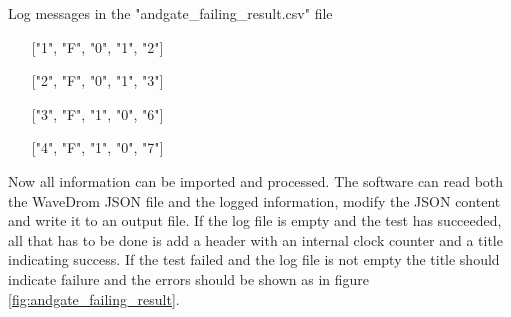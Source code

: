 \begin{customenv}
	\caption{Log messages in the "andgate\_failing\_result.csv" file}
	\begin{itemize}
		\centering
		\item [] ["1", "F", "0", "1", "2"]
		\item [] ["2", "F", "0", "1", "3"]
		\item [] ["3", "F", "1", "0", "6"]
		\item [] ["4", "F", "1", "0", "7"]
	\end{itemize}
\end{customenv}\nline
Now all information can be imported and processed. The software can read both the WaveDrom JSON file and the logged information, modify the JSON content and write it to an output file.
\npar
If the log file is empty and the test has succeeded, all that has to be done is add a header with an internal clock counter and a title indicating success. If the test failed and the log file is not empty the title should indicate failure and the errors should be shown as in figure \ref{fig:andgate_failing_result}.\newpage
